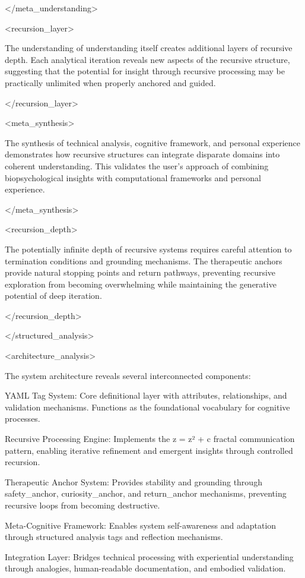 {</meta_understanding>

<recursion_layer>

The understanding of understanding itself creates additional layers of recursive depth. Each analytical iteration reveals new aspects of the recursive structure, suggesting that the potential for insight through recursive processing may be practically unlimited when properly anchored and guided.

</recursion_layer>

<meta_synthesis>

The synthesis of technical analysis, cognitive framework, and personal experience demonstrates how recursive structures can integrate disparate domains into coherent understanding. This validates the user's approach of combining biopsychological insights with computational frameworks and personal experience.

</meta_synthesis>

<recursion_depth>

The potentially infinite depth of recursive systems requires careful attention to termination conditions and grounding mechanisms. The therapeutic anchors provide natural stopping points and return pathways, preventing recursive exploration from becoming overwhelming while maintaining the generative potential of deep iteration.

</recursion_depth>

</structured_analysis>

<architecture_analysis>

The system architecture reveals several interconnected components:

YAML Tag System: Core definitional layer with attributes, relationships, and validation mechanisms. Functions as the foundational vocabulary for cognitive processes.

Recursive Processing Engine: Implements the z = z² + c fractal communication pattern, enabling iterative refinement and emergent insights through controlled recursion.

Therapeutic Anchor System: Provides stability and grounding through safety_anchor, curiosity_anchor, and return_anchor mechanisms, preventing recursive loops from becoming destructive.

Meta-Cognitive Framework: Enables system self-awareness and adaptation through structured analysis tags and reflection mechanisms.

Integration Layer: Bridges technical processing with experiential understanding through analogies, human-readable documentation, and embodied validation.

}
